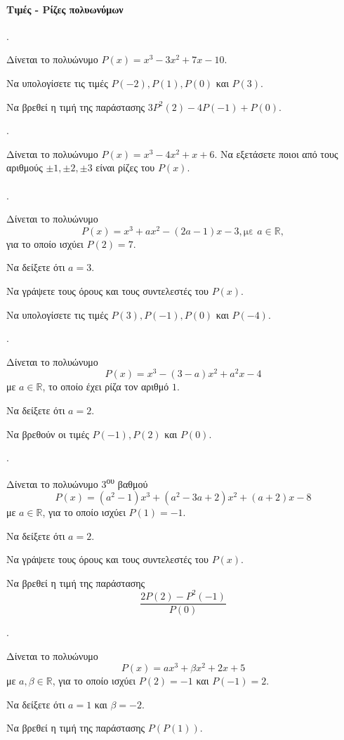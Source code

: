 \documentclass[11pt,a4paper,twocolumn]{article}
\newcounter{askhsh}
\newcommand{\askhsh}{\large\theaskhsh.\ \addtocounter{askhsh}{1}}
\newcommand{\tss}[1]{\textsuperscript{#1}}
\begin{document}
\paragraph{Τιμές - Ρίζες πολυωνύμων}
\askhsh Δίνεται το πολυώνυμο $P(x)=x^3-3x^2+7x-10$.
\begin{alist}
\item Να υπολογίσετε τις τιμές $P(-2),P(1),P(0)$ και $P(3)$.
\item Να βρεθεί η τιμή της παράστασης $3P^2(2)-4P(-1)+P(0)$.
\end{alist}
\askhsh Δίνεται το πολυώνυμο $P(x)=x^3-4x^2+x+6$. Να εξετάσετε ποιοι από τους αριθμούς $\pm1,\pm2,\pm3$ είναι ρίζες του $P(x)$.\\\\
\askhsh Δίνεται το πολυώνυμο \[P(x)=x^3+ax^2-(2a-1)x-3, \text{με }a\in\mathbb{R},\] για το οποίο ισχύει $P(2)=7$.
\begin{alist}
\item Να δείξετε ότι $a=3$.
\item Να γράψετε τους όρους και τους συντελεστές του $P(x)$.
\item Να υπολογίσετε τις τιμές $P(3),P(-1),P(0)$ και $P(-4)$.
\end{alist}
\askhsh Δίνεται το πολυώνυμο 
\[ P(x)=x^3-(3-a)x^2+a^2x-4 \]
με $a\in\mathbb{R}$, το οποίο έχει ρίζα τον αριθμό $1$.
\begin{alist}
\item Να δείξετε ότι $a=2$.
\item Να βρεθούν οι τιμές $P(-1),P(2)$ και $P(0)$.
\end{alist}
\askhsh Δίνεται το πολυώνυμο 3\tss{ου} βαθμού
\[ P(x)=(a^2-1)x^3+\left(a^2-3a+2\right)x^2+(a+2)x-8 \]
με $a\in\mathbb{R}$, για το οποίο ισχύει $P(1)=-1$.
\begin{alist}
\item  Να δείξετε ότι $a=2$.
\item  Να γράψετε τους όρους και τους συντελεστές του $P(x)$.
\item Να βρεθεί η τιμή της παράστασης \[\dfrac{2P(2)-P^2(-1)}{P(0)}\]
\end{alist}
\askhsh Δίνεται το πολυώνυμο \[P(x)=ax^3+\beta x^2+2x+5\]
με $a,\beta\in\mathbb{R}$, για το οποίο ισχύει $P(2)=-1$ και $P(-1)=2$.
\begin{alist}
\item Να δείξετε ότι $a=1$ και $\beta=-2$.
\item Να βρεθεί η τιμή της παράστασης $ P(P(1)) $.
\end{alist}
\end{document}
